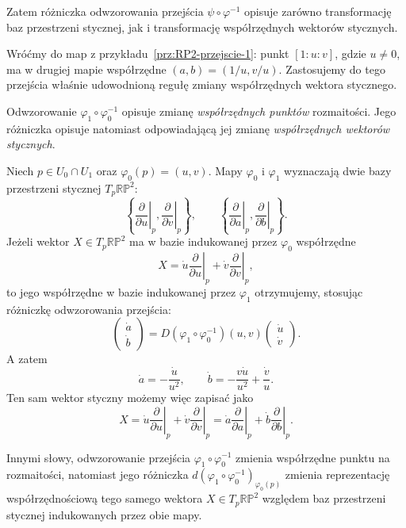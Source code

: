 Zatem różniczka odwzorowania przejścia
$\psi\circ\varphi^{-1}$ opisuje zarówno
transformację baz przestrzeni stycznej,
jak i transformację współrzędnych wektorów stycznych.

\begin{przyklad}
\label{prz:RP2-styczna-1}
Wróćmy do map z przykładu~\ref{prz:RP2-przejscie-1}:
punkt $[1:u:v]$, gdzie $u\ne0$, ma w drugiej mapie współrzędne
$(a,b)=(1/u,v/u)$. Zastosujemy do tego przejścia właśnie udowodnioną
regułę zmiany współrzędnych wektora stycznego.

Odwzorowanie $\varphi_1\circ\varphi_0^{-1}$ opisuje zmianę
\emph{współrzędnych punktów} rozmaitości. Jego różniczka opisuje natomiast
odpowiadającą jej zmianę \emph{współrzędnych wektorów stycznych}.

Niech $p\in U_0\cap U_1$ oraz $\varphi_0(p)=(u,v)$.
Mapy $\varphi_0$ i $\varphi_1$ wyznaczają dwie bazy przestrzeni stycznej
$T_p\mathbb{RP}^2$:
\[
\left\{
\left.\frac{\partial}{\partial u}\right|_p,
\left.\frac{\partial}{\partial v}\right|_p
\right\},
\qquad
\left\{
\left.\frac{\partial}{\partial a}\right|_p,
\left.\frac{\partial}{\partial b}\right|_p
\right\}.
\]
Jeżeli wektor $X\in T_p\mathbb{RP}^2$ ma w bazie indukowanej przez
$\varphi_0$ współrzędne
\[
X
=
\dot u\left.\frac{\partial}{\partial u}\right|_p
+
\dot v\left.\frac{\partial}{\partial v}\right|_p,
\]
to jego współrzędne w bazie indukowanej przez $\varphi_1$ otrzymujemy,
stosując różniczkę odwzorowania przejścia:
\[
\begin{pmatrix}
\dot a\\[1mm]
\dot b
\end{pmatrix}
=
D(\varphi_1\circ\varphi_0^{-1})(u,v)
\begin{pmatrix}
\dot u\\[1mm]
\dot v
\end{pmatrix}.
\]
A zatem
\[
\dot a=-\frac{\dot u}{u^2},
\qquad
\dot b
=
-\frac{v\dot u}{u^2}
+
\frac{\dot v}{u}.
\]
Ten sam wektor styczny możemy więc zapisać jako
\[
X
=
\dot u\left.\frac{\partial}{\partial u}\right|_p
+
\dot v\left.\frac{\partial}{\partial v}\right|_p
=
\dot a\left.\frac{\partial}{\partial a}\right|_p
+
\dot b\left.\frac{\partial}{\partial b}\right|_p.
\]

Innymi słowy, odwzorowanie przejścia
$\varphi_1\circ\varphi_0^{-1}$ zmienia współrzędne punktu na rozmaitości,
natomiast jego różniczka $d(\varphi_1\circ\varphi_0^{-1})_{\varphi_0(p)}$
zmienia reprezentację współrzędnościową tego samego wektora
$X\in T_p\mathbb{RP}^2$ względem baz przestrzeni stycznej indukowanych
przez obie mapy.
\end{przyklad}

